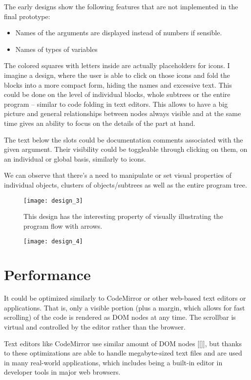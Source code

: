 The early designs show the following features that are not implemented in the
final prototype:
\begin{itemize}
	\item Names of the arguments are displayed instead of numbers if
          sensible.
	\item Names of types of variables
\end{itemize}

The colored squares with letters inside are actually placeholders for icons.  I
imagine a design, where the user is able to click on those icons and fold the
blocks into a more compact form, hiding the names and excessive text. This could
be done on the level of individual blocks, whole subtrees or the entire program
-- similar to code folding in text editors. This allows to have a big picture
and general relationships between nodes always visible and at the same time
gives an ability to focus on the details of the part at hand.

The text below the slots could be documentation comments associated with the
given argument. Their visibility could be toggleable through clicking on them,
on an individual or global basis, similarly to icons.

We can observe that there's a need to manipulate or set visual properties of
individual objects, clusters of objects/subtrees as well as the entire program
tree.


\begin{figure}[h!]
\centering \texttt{[image: design\_3]}
\caption{This design has the interesting property of visually illustrating the
  program flow with arrows.}
\label{fig:design_3}
\end{figure}


\begin{figure}[h!]
\centering \texttt{[image: design\_4]}
\caption{}
\label{fig:design_4}
\end{figure}

\section{Performance}
It could be optimized similarly to CodeMirror or other web-based text editors or
applications. That is, only a visible portion (plus a margin, which allows for
fast scrolling) of the code is rendered as DOM nodes at any time. The scrollbar
is virtual and controlled by the editor rather than the browser.

Text editors like CodeMirror use similar amount of DOM nodes [[]], but thanks to
these optimizations are able to handle
megabyte-sized\cite[Section~General Approach]{cm_internals}
text files and are used in many real-world
applications\cite{cm_realworld}, which
includes being a built-in editor in developer tools in major web browsers.

